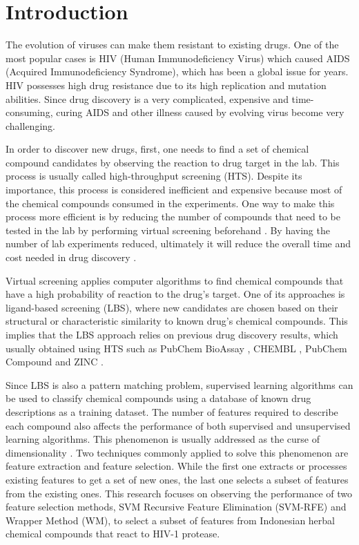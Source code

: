 \documentclass[conference]{IEEEtran}
\begin{document}
\IEEEpeerreviewmaketitle

\section{Introduction}

The evolution of viruses can make them resistant to existing drugs. One of the most popular cases is HIV (Human Immunodeficiency Virus) which caused AIDS (Acquired Immunodeficiency Syndrome), which has been a global issue for years. HIV possesses high drug resistance due to its high replication and mutation abilities. Since drug discovery is a very complicated, expensive and time-consuming, curing AIDS and other illness caused by evolving virus become very challenging\cite{yanuar2014virtual}.

In order to discover new drugs, first, one needs to find a set of chemical compound candidates by observing the reaction to drug target in the lab. This process is usually called high-throughput screening (HTS). Despite its importance, this process is considered inefficient and expensive because most of the chemical compounds consumed in the experiments. One way to make this process more efficient is by reducing the number of compounds that need to be tested in the lab by performing virtual screening beforehand \cite{chen2017developing}. By having the number of lab experiments reduced, ultimately it will reduce the overall time and cost needed in drug discovery \cite{korkmaz2014drug}.

Virtual screening applies computer algorithms to find chemical compounds that have a high probability of reaction to the drug's target. One of its approaches is ligand-based screening (LBS), where new candidates are chosen based on their structural or characteristic similarity to known drug's chemical compounds. This implies that the LBS approach relies on previous drug discovery results, which usually obtained using HTS such as PubChem BioAssay \cite{bioassay2014update}, CHEMBL \cite{bento2014chembl}, PubChem Compound \cite{kim2015pubchem} and ZINC \cite{irwin2012zinc}.

Since LBS is also a pattern matching problem, supervised learning algorithms can be used to classify chemical compounds using a database of known drug descriptions as a training dataset. The number of features required to describe each compound also affects the performance of both supervised and unsupervised learning algorithms. This phenomenon is usually addressed as the curse of dimensionality \cite{janecek2008relationship}. Two techniques commonly applied to solve this phenomenon are feature extraction and feature selection. While the first one extracts or processes existing features to get a set of new ones, the last one selects a subset of features from the existing ones. This research focuses on observing the performance of two feature selection methods, SVM Recursive Feature Elimination (SVM-RFE) and Wrapper Method (WM), to select a subset of features from Indonesian herbal chemical compounds that react to HIV-1 protease.
\end{document}
